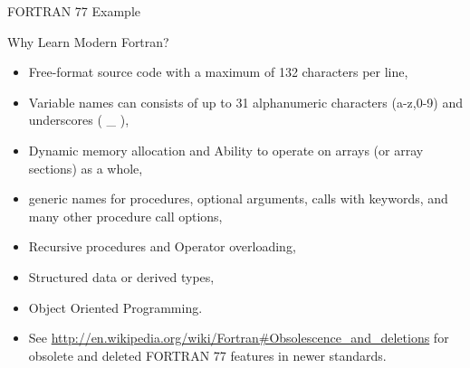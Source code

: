\documentclass[10pt,t]{beamer}
\begin{document}
\begin{frame}[fragile]{FORTRAN 77 Example}
  \begin{eblock}{SAXPY Code}
    Fortran},basicstyle=\fontsize{6}{5}\selectfont\ttfamily]{./demo/saxpy.f}
  \end{eblock}
\end{frame}

\begin{frame}{Why Learn Modern Fortran?}
  \begin{itemize}
    \item Free-format source code with a maximum of 132 characters per line,
    \item Variable names can consists of up to 31 alphanumeric characters (a-z,0-9) and underscores ( \_ ),
    \item Dynamic memory allocation and Ability to operate on arrays (or array sections) as a whole,
    \item generic names for procedures, optional arguments, calls with keywords, and many other procedure call options,
    \item Recursive procedures and Operator overloading,
    \item Structured data or derived types,
    \item Object Oriented Programming.
    \item See \url{http://en.wikipedia.org/wiki/Fortran\#Obsolescence_and_deletions} for obsolete and deleted FORTRAN 77 features in newer standards.
  \end{itemize}
\end{frame}
\end{document}
